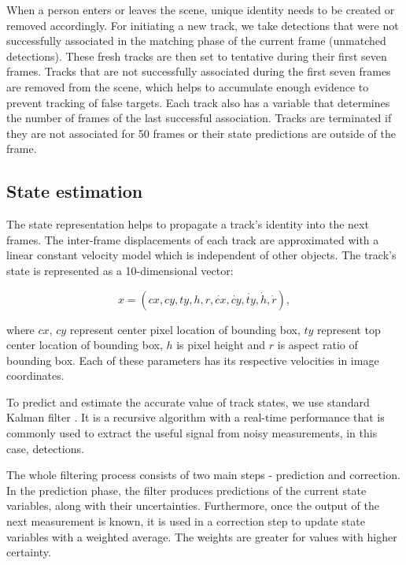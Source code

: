         When a person enters or leaves the scene, unique identity needs to be created or removed accordingly. For initiating a new track, we take detections that were not successfully associated in the matching phase of the current frame (unmatched detections). These fresh tracks are then set to tentative during their first seven frames. Tracks that are not successfully associated during the first seven frames are removed from the scene, which helps to accumulate enough evidence to prevent tracking of false targets. Each track also has a variable that determines the number of frames of the last successful association. Tracks are terminated if they are not associated for 50 frames or their state predictions are outside of the frame. 
        
    \subsection{State estimation}
        The state representation helps to propagate a track's identity into the next frames. The inter-frame displacements of each track are approximated with a linear constant velocity model which is independent of other objects. The track's state is represented as a 10-dimensional vector:
        
        \begin{equation}\label{state_vector}
            x = \left(cx, cy, ty, h, r, \dot{cx}, \dot{cy}, \dot{ty}, \dot{h}, \dot{r} \right), 
        \end{equation}
        
        where $cx$, $cy$ represent center pixel location of bounding box, $ty$ represent top center location of bounding box, $h$ is pixel height and $r$ is aspect ratio of bounding box. Each of these parameters has its respective velocities in image coordinates. 
        
        To predict and estimate the accurate value of track states, we use standard Kalman filter \cite{kalman1960new}. It is a recursive algorithm with a real-time performance that is commonly used to extract the useful signal from noisy measurements, in this case, detections. 
        
        The whole filtering process consists of two main steps - prediction and correction. In the prediction phase, the filter produces predictions of the current state variables, along with their uncertainties. Furthermore, once the output of the next measurement is known, it is used in a correction step to update state variables with a weighted average. The weights are greater for values with higher certainty.
  
